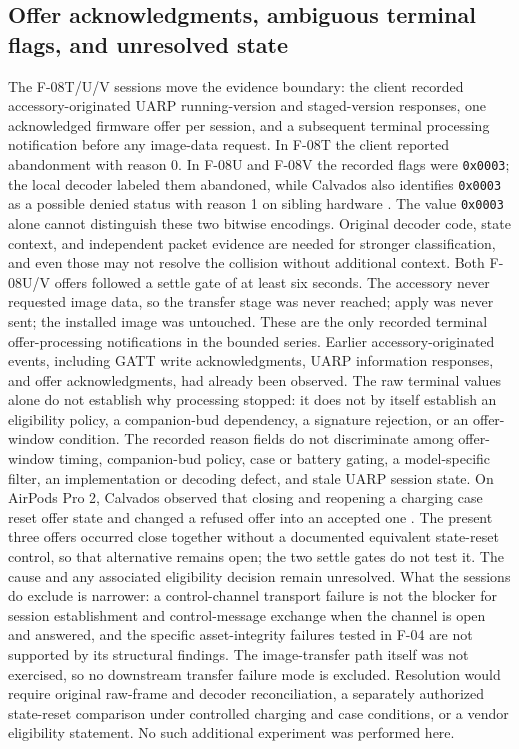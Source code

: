 \documentclass[11pt,letterpaper]{article}
\begin{document}
\subsection{Offer acknowledgments, ambiguous terminal flags, and unresolved state}
The F-08T/U/V sessions move the evidence boundary: the client recorded accessory-originated UARP running-version and staged-version responses, one acknowledged firmware offer per session, and a subsequent terminal processing notification before any image-data request. In F-08T the client reported abandonment with reason 0. In F-08U and F-08V the recorded flags were \texttt{0x0003}; the local decoder labeled them abandoned, while Calvados also identifies \texttt{0x0003} as a possible denied status with reason 1 on sibling hardware \cite{calvados}. The value \texttt{0x0003} alone cannot distinguish these two bitwise encodings. Original decoder code, state context, and independent packet evidence are needed for stronger classification, and even those may not resolve the collision without additional context. Both F-08U/V offers followed a settle gate of at least six seconds. The accessory never requested image data, so the transfer stage was never reached; apply was never sent; the installed image was untouched. These are the only recorded terminal offer-processing notifications in the bounded series. Earlier accessory-originated events, including GATT write acknowledgments, UARP information responses, and offer acknowledgments, had already been observed. The raw terminal values alone do not establish why processing stopped: it does not by itself establish an eligibility policy, a companion-bud dependency, a signature rejection, or an offer-window condition. The recorded reason fields do not discriminate among offer-window timing, companion-bud policy, case or battery gating, a model-specific filter, an implementation or decoding defect, and stale UARP session state. On AirPods Pro 2, Calvados observed that closing and reopening a charging case reset offer state and changed a refused offer into an accepted one \cite{calvados}. The present three offers occurred close together without a documented equivalent state-reset control, so that alternative remains open; the two settle gates do not test it. The cause and any associated eligibility decision remain unresolved. What the sessions do exclude is narrower: a control-channel transport failure is not the blocker for session establishment and control-message exchange when the channel is open and answered, and the specific asset-integrity failures tested in F-04 are not supported by its structural findings. The image-transfer path itself was not exercised, so no downstream transfer failure mode is excluded. Resolution would require original raw-frame and decoder reconciliation, a separately authorized state-reset comparison under controlled charging and case conditions, or a vendor eligibility statement. No such additional experiment was performed here.
\end{document}
